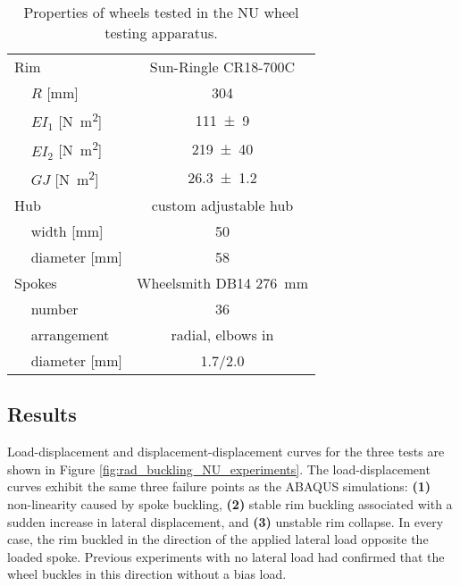\documentclass[\rootdir/thesis.tex]{subfiles}
\begin{document}
\begin{table}
\caption{Properties of wheels tested in the NU wheel testing apparatus.}
\label{tab:rad_buckling_wheels}
\begin{tabular}{llc}
\hline
\multicolumn{2}{l}{Rim}& Sun-Ringle CR18-700C\\
\,& $R$ [\si{mm}] & \num{304}\\
\,& $EI_1$ [\si{N.m^2}]     & \num{111+-9}\\
\,& $EI_2$ [\si{N.m^2}]     & \num{219+-40}\\
\,& $GJ$   [\si{N.m^2}]     & \num{26.3+-1.2}\\
\multicolumn{2}{l}{Hub} & custom adjustable hub\\
\,& width [\si{mm}]     & 50\\
\,& diameter [\si{mm}]  & 58\\
\multicolumn{2}{l}{Spokes} & Wheelsmith DB14 \SI{276}{mm}\\
\,& number                 & 36\\
\,& arrangement            & radial, elbows in\\
\,& diameter [\si{mm}]     & 1.7/2.0\\
\hline
\end{tabular}
\end{table}

\subsection{Results}

Load-displacement and displacement-displacement curves for the three tests are shown in Figure \ref{fig:rad_buckling_NU_experiments}. The load-displacement curves exhibit the same three failure points as the ABAQUS simulations: \textbf{(1)} non-linearity caused by spoke buckling, \textbf{(2)} stable rim buckling associated with a sudden increase in lateral displacement, and \textbf{(3)} unstable rim collapse. In every case, the rim buckled in the direction of the applied lateral load opposite the loaded spoke. Previous experiments with no lateral load had confirmed that the wheel buckles in this direction without a bias load.
\end{document}
